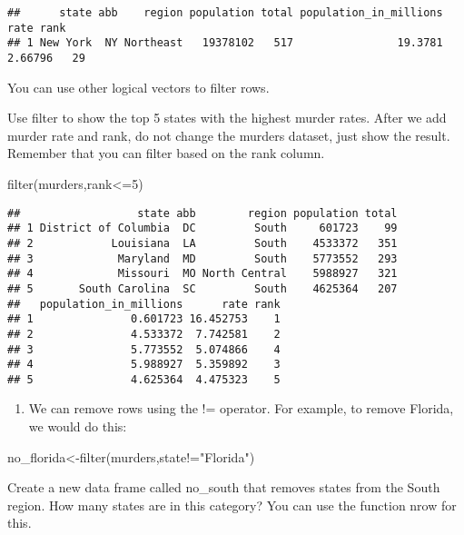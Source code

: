 \documentclass[
]{article}
\newenvironment{Shaded}{\begin{snugshade}}{\end{snugshade}}
\newcommand{\DecValTok}[1]{\textcolor[rgb]{0.00,0.00,0.81}{#1}}
\newcommand{\FunctionTok}[1]{\textcolor[rgb]{0.00,0.00,0.00}{#1}}
\newcommand{\NormalTok}[1]{#1}
\newcommand{\OtherTok}[1]{\textcolor[rgb]{0.56,0.35,0.01}{#1}}
\newcommand{\SpecialCharTok}[1]{\textcolor[rgb]{0.00,0.00,0.00}{#1}}
\newcommand{\StringTok}[1]{\textcolor[rgb]{0.31,0.60,0.02}{#1}}
\providecommand{\tightlist}{%
  \setlength{\itemsep}{0pt}\setlength{\parskip}{0pt}}
\begin{document}
\begin{verbatim}
##      state abb    region population total population_in_millions    rate rank
## 1 New York  NY Northeast   19378102   517                19.3781 2.66796   29
\end{verbatim}

You can use other logical vectors to filter rows.

Use filter to show the top 5 states with the highest murder rates. After
we add murder rate and rank, do not change the murders dataset, just
show the result. Remember that you can filter based on the rank column.

\begin{Shaded}
\begin{Highlighting}[]
\FunctionTok{filter}\NormalTok{(murders,rank}\SpecialCharTok{\textless{}=}\DecValTok{5}\NormalTok{)}
\end{Highlighting}
\end{Shaded}

\begin{verbatim}
##                  state abb        region population total
## 1 District of Columbia  DC         South     601723    99
## 2            Louisiana  LA         South    4533372   351
## 3             Maryland  MD         South    5773552   293
## 4             Missouri  MO North Central    5988927   321
## 5       South Carolina  SC         South    4625364   207
##   population_in_millions      rate rank
## 1               0.601723 16.452753    1
## 2               4.533372  7.742581    2
## 3               5.773552  5.074866    4
## 4               5.988927  5.359892    3
## 5               4.625364  4.475323    5
\end{verbatim}

\begin{enumerate}
\def\labelenumi{\arabic{enumi}.}
\setcounter{enumi}{4}
\tightlist
\item
  We can remove rows using the != operator. For example, to remove
  Florida, we would do this:
\end{enumerate}

\begin{Shaded}
\begin{Highlighting}[]
\NormalTok{no\_florida}\OtherTok{\textless{}{-}}\FunctionTok{filter}\NormalTok{(murders,state}\SpecialCharTok{!=}\StringTok{"Florida"}\NormalTok{)}
\end{Highlighting}
\end{Shaded}

Create a new data frame called no\_south that removes states from the
South region. How many states are in this category? You can use the
function nrow for this.
\end{document}

